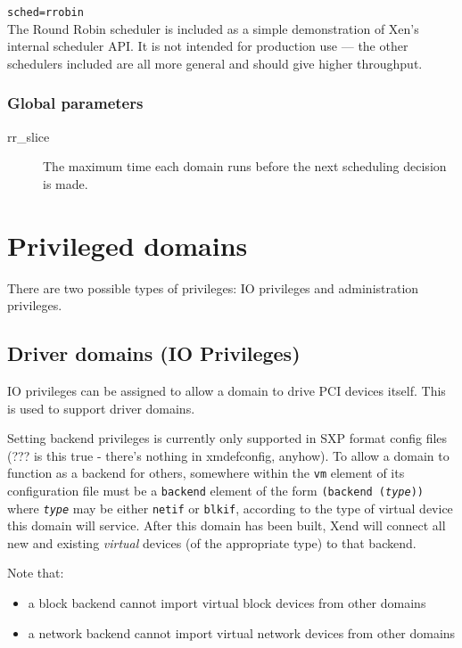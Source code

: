 \documentclass[11pt,twoside,final,openright]{xenstyle}
\begin{document}
{{\tt sched=rrobin } \\

The Round Robin scheduler is included as a simple demonstration of
Xen's internal scheduler API.  It is not intended for production use
--- the other schedulers included are all more general and should give
higher throughput.

\subsection{Global parameters}

\begin{description}
\item[rr\_slice]
  The maximum time each domain runs before the next
  scheduling decision is made.
\end{description}

\chapter{Privileged domains}

There are two possible types of privileges:  IO privileges and
administration privileges.

\section{Driver domains (IO Privileges)}

IO privileges can be assigned to allow a domain to drive PCI devices
itself.  This is used to support driver domains.

Setting backend privileges is currently only supported in SXP format
config files (??? is this true - there's nothing in xmdefconfig,
anyhow).  To allow a domain to function as a backend for others,
somewhere within the {\tt vm} element of its configuration file must
be a {\tt backend} element of the form {\tt (backend ({\em type}))}
where {\tt \em type} may be either {\tt netif} or {\tt blkif},
according to the type of virtual device this domain will service.
After this domain has been built, Xend will connect all new and
existing {\em virtual} devices (of the appropriate type) to that
backend.

Note that:
\begin{itemize}
\item a block backend cannot import virtual block devices from other
domains
\item a network backend cannot import virtual network devices from
other domains
\end{itemize}

}
\end{document}
